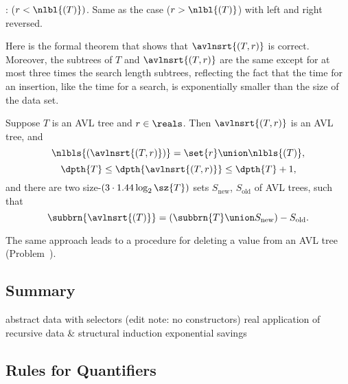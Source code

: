 \begin{definition}
\begin{definition}
: ($r < \nlbl{(T)})$.  Same as the case ($r >
\nlbl{(T)}$) with left and right reversed.
\end{definition}

Here is the formal theorem that shows that $\avlnsrt{(T,r)}$ is
correct.  Moreover, the subtrees of $T$ and $\avlnsrt{(T,r)}$ are the
same except for at most three times the search length subtrees,
reflecting the fact that the time for an insertion, like the time for
a search, is exponentially smaller than the size of the data set.

\begin{theorem}\label{thm:correct-avl-insert}
Suppose $T$ is an AVL tree and $r \in \reals$.
Then $\avlnsrt{(T,r)}$ is an AVL tree, and
\[
\nlbls{(\avlnsrt{(T,r)})} = \set{r} \union \nlbls{(T)},
\]
\[
\dpth{T} \leq \dpth{\avlnsrt{(T,r)}} \leq \dpth{T}+1,
\]
and there are two size-$(3\cdot 1.44 \log_2 \sz{T})$ sets $S_{\text{new}}$,
$S_{\text{old}}$ of AVL trees, such that
\[
\subbrn{\avlnsrt{(T)}} = (\subbrn{T}\union S_{\text{new}}) - S_{\text{old}}.
\]
\end{theorem}

The same approach leads to a procedure for deleting a value from an
AVL tree (Problem~).

\begin{editingnotes}
\subsection{Summary}
abstract data with selectors (edit note: no constructors)
real application of recursive data & structural induction
exponential savings
\end{editingnotes}

\begin{problems}
\practiceproblems
{}

\classproblems
{}

\homeworkproblems
{}

\examproblems
{}
\end{problems}

\begin{editingnotes}

\section{Rules for Quantifiers}


\end{editingnotes}
\end{definition}
